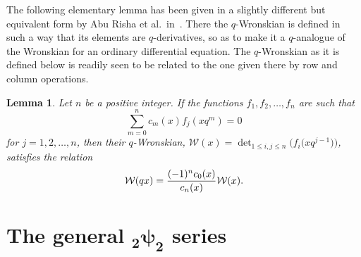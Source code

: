 \documentclass[10pt,a4paper]{amsart}
\numberwithin{equation}{section}
\newtheorem{Lemma}[Theorem]{Lemma}
\begin{document}
The following elementary lemma has been given in a slightly different but equivalent form by Abu Risha et al.\ in~\cite[Theorem~3.3]{AbuRisha2007}. There the $q$-Wronskian is defined in such a way that its elements are $q$-derivatives, so as to make it a $q$-analogue of the Wronskian for an ordinary differential equation. The $q$-Wronskian as it is defined below is readily seen to be related to the one given there by row and column operations.

\begin{Lemma} \label{lem:Wronskian}
Let $n$ be a positive integer. If the functions $f_1, f_2, \dots, f_n$ are such that
\[ \sum_{m=0}^n c_m(x) f_j(xq^m) = 0 \]
for $j=1,2,\dots,n$, then their $q$-Wronskian, $\mathcal{W}(x) = \det_{1\leq i,j \leq n} \bigl( f_i\bigl(xq^{j-1}\bigr) \bigr)$, satisfies the relation
\[ \mathcal{W}(qx) = {(-1)^n c_0(x) \over c_n(x)} \mathcal{W}(x). \]
\end{Lemma}


\section[The general \_2psi\_2 series]{The general $\boldsymbol{_2\psi_2}$ series} \label{sect:2psi2_series}
\end{document}
